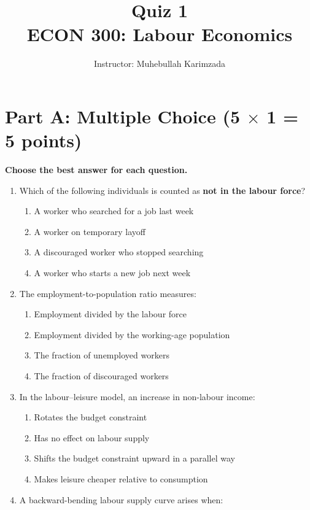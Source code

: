 \documentclass[11pt]{article}
\title{\textbf{Quiz 1} \vspace{ 0.4cm }\\ECON 300: Labour Economics}
\author{Instructor: Muhebullah Karimzada}
\begin{document}
\maketitle

\section*{Part A: Multiple Choice (5 $\times$ 1 = 5 points)}

\textbf{Choose the best answer for each question.}

\begin{enumerate}
\item Which of the following individuals is counted as \textbf{not in the labour force}?

\begin{enumerate}
\item A worker who searched for a job last week  
\item A worker on temporary layoff  
\item A discouraged worker who stopped searching  
\item A worker who starts a new job next week  
\end{enumerate}

\item The employment-to-population ratio measures:

\begin{enumerate}
\item Employment divided by the labour force  
\item Employment divided by the working-age population  
\item The fraction of unemployed workers  
\item The fraction of discouraged workers  
\end{enumerate}

\item In the labour--leisure model, an increase in non-labour income:

\begin{enumerate}
\item Rotates the budget constraint  
\item Has no effect on labour supply  
\item Shifts the budget constraint upward in a parallel way  
\item Makes leisure cheaper relative to consumption  
\end{enumerate}

\item A backward-bending labour supply curve arises when:


\end{enumerate}
\end{document}
